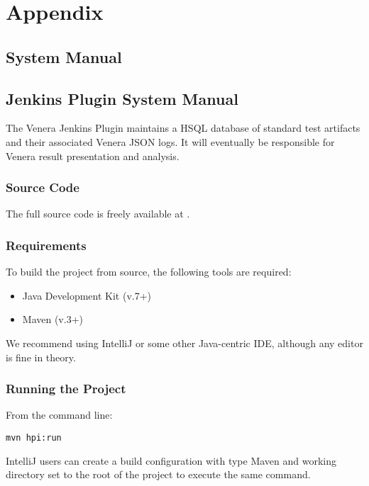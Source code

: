 \section{Appendix}
\label{sec:appendix}

\subsection{\venera System Manual}

\subsection{\venera Jenkins Plugin System Manual}

The Venera Jenkins Plugin maintains a HSQL database of standard test artifacts
and their associated Venera JSON logs. It will eventually be responsible for
Venera result presentation and analysis.

\subsubsection{Source Code}

The full source code is freely available at \cite{heisentestPlugin}.

\subsubsection{Requirements}

To build the project from source, the following tools are required:

\begin{itemize}
  \item Java Development Kit (v.7+) \cite{jdk}
  \item Maven (v.3+) \cite{maven}
\end{itemize}

We recommend using IntelliJ \cite{intellij} or some other Java-centric IDE,
although any editor is fine in theory.

\subsubsection{Running the Project}

From the command line:

\begin{lstlisting}[numbers=none]
mvn hpi:run
\end{lstlisting}

IntelliJ users can create a build configuration with type Maven and working
directory set to the root of the project to execute the same command.

